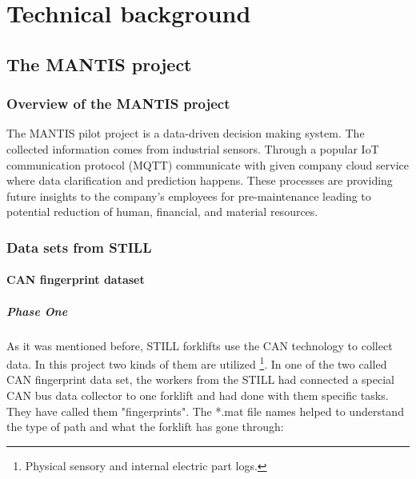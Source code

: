 \chapter{Technical background}
	\section{The MANTIS project}
		\subsection{Overview of the MANTIS project}
The MANTIS pilot project is a data-driven decision making system. The collected information comes from industrial sensors. Through a popular IoT communication protocol (MQTT) communicate with given company cloud service where data clarification and prediction happens. These processes are providing future insights to the company's employees for pre-maintenance leading to potential reduction of human, financial, and material resources.\cite{Mantis}

		\subsection{Data sets from STILL}
			\subsubsection{CAN fingerprint dataset}
				\paragraph{Phase One}
				\noindent
As it was mentioned before, STILL forklifts \cite{RX20} use the CAN technology to collect data. In this project two kinds of them are utilized \footnote{Physical sensory and internal electric part logs.}. In one of the two called CAN fingerprint data set, the workers from the STILL had connected a special CAN bus data collector to one forklift and had done with them specific tasks. They have called them "fingerprints". The *.mat file names helped to understand the type of path and what the forklift has gone through:

